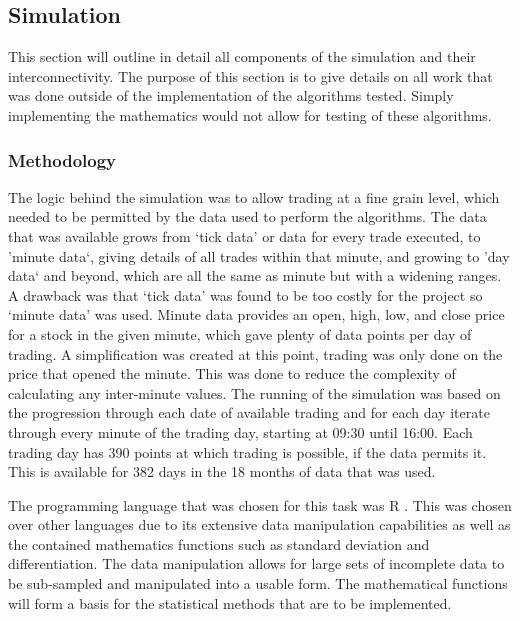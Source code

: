 \documentclass[conference]{IEEEtran}
\begin{document}

\subsection{Simulation}

This section will outline in detail all components of the simulation and their interconnectivity. The purpose of this section is to give details on all work that was done outside of the implementation of the algorithms tested. Simply implementing the mathematics would not allow for testing of these algorithms. 

\subsubsection{Methodology}

The logic behind the simulation was to allow trading at a fine grain level, which needed to be permitted by the data used to perform the algorithms. The data that was available grows from `tick data' or data for every trade executed, to 'minute data`, giving details of all trades within that minute, and growing to 'day data` and beyond, which are all the same as minute but with a widening ranges. A drawback was that `tick data' was found to be too costly for the project so `minute data' was used. Minute data provides an open, high, low, and close price for a stock in the given minute, which gave plenty of data points per day of trading. A simplification was created at this point, trading was only done on the price that opened the minute. This was done to reduce the complexity of calculating any inter-minute values. The running of the simulation was based on the progression through each date of available trading and for each day iterate through every minute of the trading day, starting at 09:30 until 16:00. Each trading day has 390 points at which trading is possible, if the data permits it. This is available for 382 days in the 18 months of data that was used. 

The programming language that was chosen for this task was R \cite{Team2013}. This was chosen over other languages due to its extensive data manipulation capabilities as well as the contained mathematics functions such as standard deviation and differentiation. The data manipulation allows for large sets of incomplete data to be sub-sampled and manipulated into a usable form. The mathematical functions will form a basis for the statistical methods that are to be implemented.
\end{document}
